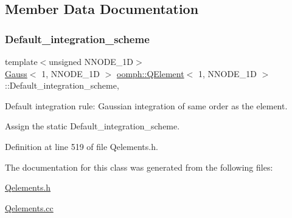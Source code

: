 \subsection{Member Data Documentation}
\mbox{\label{classoomph_1_1QElement_3_011_00_01NNODE__1D_01_4_a885bd236427af390a48d346e01eeb469}} 
\subsubsection{\texorpdfstring{Default\+\_\+integration\+\_\+scheme}{Default\_integration\_scheme}}
{\footnotesize\ttfamily template$<$unsigned N\+N\+O\+D\+E\+\_\+1D$>$ \\
\hyperlink{classoomph_1_1Gauss}{Gauss}$<$ 1, N\+N\+O\+D\+E\+\_\+1D $>$ \hyperlink{classoomph_1_1QElement}{oomph\+::\+Q\+Element}$<$ 1, N\+N\+O\+D\+E\+\_\+1D $>$\+::Default\+\_\+integration\+\_\+scheme\hspace{0.3cm}{\ttfamily [static]}, {\ttfamily [private]}}



Default integration rule\+: Gaussian integration of same \textquotesingle{}order\textquotesingle{} as the element. 

Assign the static Default\+\_\+integration\+\_\+scheme. 

Definition at line 519 of file Qelements.\+h.



The documentation for this class was generated from the following files\+:\begin{DoxyCompactItemize}
\item 
\hyperlink{Qelements_8h}{Qelements.\+h}\item 
\hyperlink{Qelements_8cc}{Qelements.\+cc}\end{DoxyCompactItemize}
